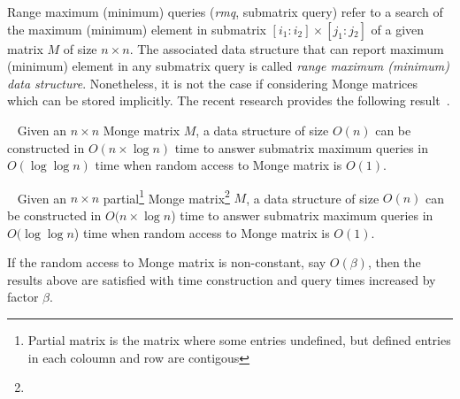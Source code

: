 Range maximum (minimum) que\-ries (\emph{rmq}, submatrix query) refer to a search of the maximum (minimum) element in submatrix $[i_{1}:i{_2}]\times [j_{1}:j{_2}]$ of a given matrix $M$ of size $n \times n$.
The associated data structure that can report maximum (minimum) element in any submatrix query is called \emph{range maximum (minimum) data structure}.
Nonetheless, it is not the case if considering Monge matrices which can be stored implicitly.
The recent research provides the following result~\cite{.}.

\begin{theorem}~\cite{.}
Given an $n \times n$ Monge matrix $M$, a data structure of size $O(n)$ can be constructed in $O(n \times \log n)$ time to answer submatrix maximum queries in $O(\log \log n)$ time when random access to Monge matrix is $O(1)$.
\end{theorem}


\begin{theorem}~\cite{.}
Given an $n \times n$ partial\footnote{Partial matrix is the matrix where some entries undefined, but defined entries in each coloumn and row are contigous} Monge matrix\footnote{} $M$, a data structure of size $O(n)$ can be constructed in $O(n \times \log n$) time to answer submatrix maximum queries in $O(\log \log n$) time when random access to Monge matrix is $O(1)$.
\end{theorem}

If the random access to Monge matrix is non-constant, say $O(\beta)$, then the results above are satisfied with time construction and query times increased by factor $\beta$.
  
